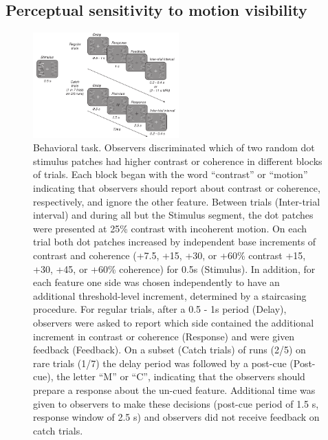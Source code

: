 \subsection{Perceptual sensitivity to motion visibility}


\begin{figure}
\centering
\includegraphics[keepaspectratio,width=0.5\textwidth]{figs_c3/Fig1_behav.pdf}
\caption[Behavioral task]{Behavioral task. Observers discriminated which of two random dot stimulus patches had higher contrast or coherence in different blocks of trials. Each block began with the word “contrast” or “motion” indicating that observers should report about contrast or coherence, respectively, and ignore the other feature. Between trials (Inter-trial interval) and during all but the Stimulus segment, the dot patches were presented at 25\% contrast with incoherent motion. On each trial both dot patches increased by independent base increments of contrast and coherence (+7.5, +15, +30, or +60\% contrast +15, +30, +45, or +60\% coherence) for 0.5s (Stimulus). In addition, for each feature one side was chosen independently to have an additional threshold-level increment, determined by a staircasing procedure. For regular trials, after a 0.5 - 1s period (Delay), observers were asked to report which side contained the additional increment in contrast or coherence (Response) and were given feedback (Feedback). On a subset (Catch trials) of runs (2/5) on rare trials (1/7) the delay period was followed by a post-cue (Post-cue), the letter “M” or “C”, indicating that the observers should prepare a response about the un-cued feature. Additional time was given to observers to make these decisions (post-cue period of 1.5 s, response window of 2.5 s) and observers did not receive feedback on catch trials.}
\label{fig:c3f1}
\end{figure}

